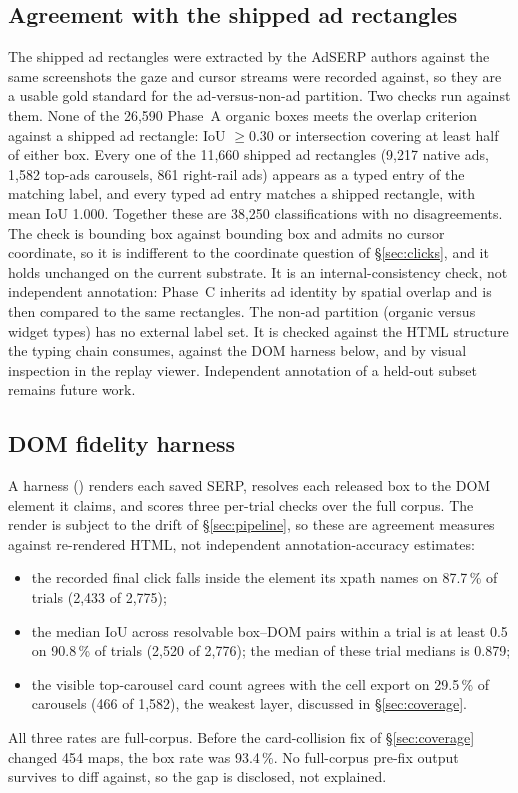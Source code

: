\documentclass[sigconf,authorversion,natbib=true]{acmart}
\begin{document}
\subsection{Agreement with the shipped ad rectangles}

The shipped ad rectangles were extracted by the AdSERP authors against the same screenshots the gaze and cursor streams were recorded against, so they are a usable gold standard for the ad-versus-non-ad partition. Two checks run against them. None of the 26,590 Phase~A organic boxes meets the overlap criterion against a shipped ad rectangle: IoU $\geq 0.30$ or intersection covering at least half of either box. Every one of the 11,660 shipped ad rectangles (9,217 native ads, 1,582 top-ads carousels, 861 right-rail ads) appears as a typed entry of the matching label, and every typed ad entry matches a shipped rectangle, with mean IoU 1.000. Together these are 38,250 classifications with no disagreements. The check is bounding box against bounding box and admits no cursor coordinate, so it is indifferent to the coordinate question of \S\ref{sec:clicks}, and it holds unchanged on the current substrate. It is an internal-consistency check, not independent annotation: Phase~C inherits ad identity by spatial overlap and is then compared to the same rectangles. The non-ad partition (organic versus widget types) has no external label set. It is checked against the HTML structure the typing chain consumes, against the DOM harness below, and by visual inspection in the replay viewer. Independent annotation of a held-out subset remains future work.

\subsection{DOM fidelity harness}

A harness () renders each saved SERP, resolves each released box to the DOM element it claims, and scores three per-trial checks over the full corpus. The render is subject to the drift of \S\ref{sec:pipeline}, so these are agreement measures against re-rendered HTML, not independent annotation-accuracy estimates:
\begin{itemize}
  \item the recorded final click falls inside the element its xpath names on 87.7\,\% of trials (2,433 of 2,775);
  \item the median IoU across resolvable box--DOM pairs within a trial is at least 0.5 on 90.8\,\% of trials (2,520 of 2,776); the median of these trial medians is 0.879;
  \item the visible top-carousel card count agrees with the cell export on 29.5\,\% of carousels (466 of 1,582), the weakest layer, discussed in \S\ref{sec:coverage}.
\end{itemize}
All three rates are full-corpus. Before the card-collision fix of \S\ref{sec:coverage} changed 454 maps, the box rate was 93.4\,\%. No full-corpus pre-fix output survives to diff against, so the gap is disclosed, not explained.
\end{document}

